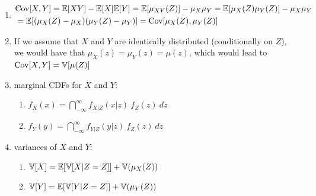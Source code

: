 \begin{enumerate}
    \item 
    $
        \begin{aligned}
            &\text{Cov}[X, Y] 
            = \mathbb{E}[X Y] - \mathbb{E}[X] \mathbb{E}[Y]
            = \mathbb{E}[\mu_{X Y} (Z )] - \mu_X \mu_Y 
            = \mathbb{E}[\mu_X (Z )\mu_Y (Z )] - \mu_X \mu_Y\\
            &= \mathbb{E}[(\mu_X (Z ) - \mu_X )(\mu_Y (Z ) - \mu_Y )] 
            = \text{Cov}[\mu_X (Z ), \mu_Y (Z )]
        \end{aligned}
    $
    \hfill \cite{statistics/book/Statistics-for-Data-Scientists/Maurits-Kaptein}

    \item If we assume that $X$ and $Y$ are identically distributed (conditionally on $Z$), we would have that $\mu_X (z) = \mu_Y (z) = \mu(z)$, which would lead to $\text{Cov}[X, Y] = \mathbb{V}[\mu(Z)] $
    \hfill \cite{statistics/book/Statistics-for-Data-Scientists/Maurits-Kaptein}

    \item marginal CDFs for $X$ and $Y$:
    \hfill \cite{statistics/book/Statistics-for-Data-Scientists/Maurits-Kaptein}
    \begin{multicols}{2}
    \begin{enumerate}
        \item $ f_X (x) = \dint_{-\infty}^\infty f_{X|Z} (x|z)\ f_Z (z)\ dz $
        \hfill \cite{statistics/book/Statistics-for-Data-Scientists/Maurits-Kaptein}

        \item $ f_Y (y) = \dint_{-\infty}^\infty f_{Y |Z} (y|z)\ f_Z (z)\ dz $
        \hfill \cite{statistics/book/Statistics-for-Data-Scientists/Maurits-Kaptein}
    \end{enumerate}
    \end{multicols}

    \item variances of $X$ and $Y$:
    \hfill \cite{statistics/book/Statistics-for-Data-Scientists/Maurits-Kaptein}
    \begin{multicols}{2}
    \begin{enumerate}
        \item $\mathbb{V}[X] = \mathbb{E}[\mathbb{V}[X|Z = Z]] + \mathbb{V}(\mu_X (Z ))$
        \hfill \cite{statistics/book/Statistics-for-Data-Scientists/Maurits-Kaptein}
        
        \item $\mathbb{V}[Y] = \mathbb{E}[\mathbb{V}[Y |Z = Z]] + \mathbb{V}(\mu_Y (Z ))$
        \hfill \cite{statistics/book/Statistics-for-Data-Scientists/Maurits-Kaptein}
    \end{enumerate}
    \end{multicols}


\end{enumerate}
